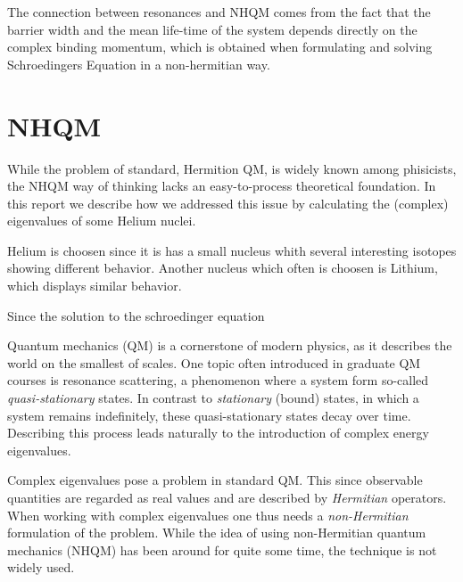 The connection between resonances and NHQM comes from the fact that the barrier width and the mean life-time of the system depends directly on the complex binding momentum,
which is obtained when formulating and solving Schroedingers Equation in a non-hermitian way.


\section{NHQM}
While the problem of standard, Hermition QM, is widely known among phisicists, the NHQM way of thinking lacks an easy-to-process theoretical foundation.
In this report we describe how we addressed this issue by calculating the (complex) eigenvalues of some Helium nuclei.

Helium is choosen since it is has a small nucleus whith several interesting isotopes showing different behavior.
Another nucleus which often is choosen is Lithium, which displays similar behavior.

Since the solution to the schroedinger equation 








Quantum mechanics (QM) is a cornerstone of modern physics, as it describes the world on the smallest of scales.
One topic often introduced in graduate QM courses is resonance scattering, a phenomenon where a system form so-called \emph{quasi-stationary} states.
In contrast to \emph{stationary} (bound) states, in which a system remains indefinitely, these quasi-stationary states decay over time.
Describing this process leads naturally to the introduction of complex energy eigenvalues. 

Complex eigenvalues pose a problem in standard QM.
This since observable quantities are regarded as real values and are described by \emph{Hermitian} operators.
When working with complex eigenvalues one thus needs a \emph{non-Hermitian} formulation of the problem.
While the idea of using non-Hermitian quantum mechanics (NHQM) has been around for quite some time, the technique is not widely used.